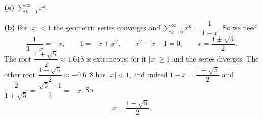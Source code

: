 \textbf{(a)} $\displaystyle\sum_{k=0}^{\infty}x^k$.

\textbf{(b)} For $|x|<1$ the geometric series converges and $\displaystyle\sum_{k=0}^{\infty}x^k=\dfrac{1}{1-x}$. So we need
\[\dfrac{1}{1-x}=-x,\qquad 1=-x+x^2,\qquad x^2-x-1=0,\qquad x=\dfrac{1\pm\sqrt5}{2}.\]
The root $\dfrac{1+\sqrt5}{2}\approx1.618$ is extraneous: for it $|x|\ge1$ and the series diverges. The other root $\dfrac{1-\sqrt5}{2}\approx-0.618$ has $|x|<1$, and indeed $1-x=\dfrac{1+\sqrt5}{2}$ and $\dfrac{2}{1+\sqrt5}=\dfrac{\sqrt5-1}{2}=-x$. So
\[x=\boxed{\dfrac{1-\sqrt5}{2}}.\]
